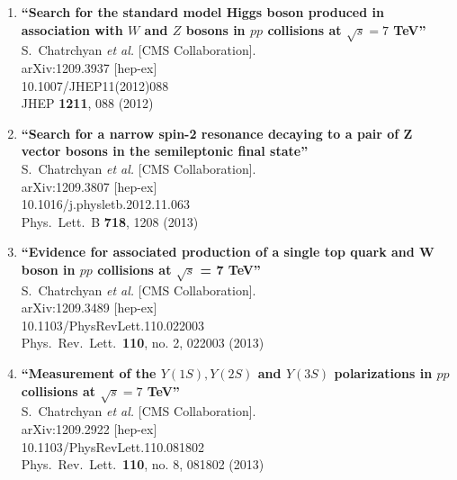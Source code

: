 \documentclass{article}
\begin{document}
\begin{enumerate}
\item%
{\bf ``Search for the standard model Higgs boson produced in association with $W$ and $Z$ bosons in $pp$ collisions at $\sqrt{s}=7$ TeV''}
  \\{}S.~Chatrchyan {\it et al.}  [CMS Collaboration].
  \\{}arXiv:1209.3937 [hep-ex]
    \\{}10.1007/JHEP11(2012)088
\\{}JHEP {\bf 1211}, 088 (2012) %


\item%
{\bf ``Search for a narrow spin-2 resonance decaying to a pair of Z vector bosons in the semileptonic final state''}
  \\{}S.~Chatrchyan {\it et al.}  [CMS Collaboration].
  \\{}arXiv:1209.3807 [hep-ex]
    \\{}10.1016/j.physletb.2012.11.063
\\{}Phys.\ Lett.\ B {\bf 718}, 1208 (2013) %


\item%
{\bf ``Evidence for associated production of a single top quark and W boson in $pp$ collisions at $\sqrt{s}$ = 7 TeV''}
  \\{}S.~Chatrchyan {\it et al.}  [CMS Collaboration].
  \\{}arXiv:1209.3489 [hep-ex]
    \\{}10.1103/PhysRevLett.110.022003
\\{}Phys.\ Rev.\ Lett.\  {\bf 110}, no. 2, 022003 (2013) %


\item%
{\bf ``Measurement of the $Y(1S), Y(2S)$ and $Y(3S)$ polarizations in $pp$ collisions at $\sqrt{s}=7$ TeV''}
  \\{}S.~Chatrchyan {\it et al.}  [CMS Collaboration].
  \\{}arXiv:1209.2922 [hep-ex]
    \\{}10.1103/PhysRevLett.110.081802
\\{}Phys.\ Rev.\ Lett.\  {\bf 110}, no. 8, 081802 (2013) %



\end{enumerate}
\end{document}
